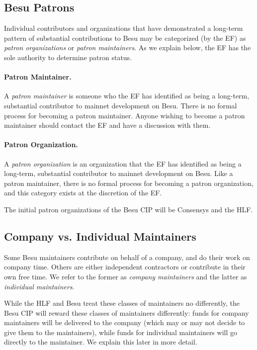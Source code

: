 \subsection{Besu Patrons}
Individual contributors and organizations that have demonstrated a long-term pattern of substantial contributions to Besu may be categorized (by the EF) as \emph{patron organizations} or \emph{patron maintainers}.  As we explain below, the EF has the sole authority to determine patron status.

\paragraph{Patron Maintainer.}  A \emph{patron maintainer} is someone who the EF has identified as being a long-term, substantial contributor to mainnet development on Besu.  There is no formal process for becoming a patron maintainer.  Anyone wishing to become a patron maintainer should contact the EF and have a discussion with them.

\paragraph{Patron Organization.}  A \emph{patron organization} is an organization that the EF has identified as being a long-term, substantial contributor to mainnet development on Besu.  Like a patron maintainer, there is no formal process for becoming a patron organization, and this category exists at the discretion of the EF.

The initial patron organizations of the Besu CIP will be Consensys and the HLF.

\subsection{Company vs. Individual Maintainers}
Some Besu maintainers contribute on behalf of a company, and do their work on company time.  Others are either independent contractors or contribute in their own free time.  We refer to the former as \emph{company maintainers} and the latter as \emph{individual maintainers}.

While the HLF and Besu treat these classes of maintainers no differently, the Besu CIP will reward these classes of maintainers differently:  funds for company maintainers will be delivered to the company (which may or may not decide to give them to the maintainers), while funds for individual maintainers will go directly to the maintainer.  We explain this later in more detail.

